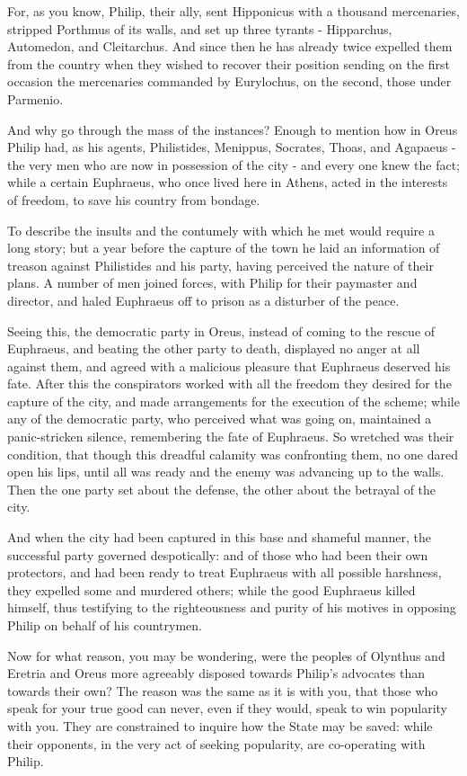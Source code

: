 \documentclass[a4paper]{amsbook}
\begin{document}
For, as you know, Philip, their ally, sent Hipponicus with a thousand mercenaries, stripped Porthmus of its walls, and set up three tyrants - Hipparchus, Automedon, and Cleitarchus. And since then he has already twice expelled them from the country when they wished to recover their position sending on the first occasion the mercenaries commanded by Eurylochus, on the second, those under Parmenio.

And why go through the mass of the instances? Enough to mention how in Oreus Philip had, as his agents, Philistides, Menippus, Socrates, Thoas, and Agapaeus - the very men who are now in possession of the city - and every one knew the fact; while a certain Euphraeus, who once lived here in Athens, acted in the interests of freedom, to save his country from bondage.

To describe the insults and the contumely with which he met would require a long story; but a year before the capture of the town he laid an information of treason against Philistides and his party, having perceived the nature of their plans. A number of men joined forces, with Philip for their paymaster and director, and haled Euphraeus off to prison as a disturber of the peace.

Seeing this, the democratic party in Oreus, instead of coming to the rescue of Euphraeus, and beating the other party to death, displayed no anger at all against them, and agreed with a malicious pleasure that Euphraeus deserved his fate. After this the conspirators worked with all the freedom they desired for the capture of the city, and made arrangements for the execution of the scheme; while any of the democratic party, who perceived what was going on, maintained a panic-stricken silence, remembering the fate of Euphraeus. So wretched was their condition, that though this dreadful calamity was confronting them, no one dared open his lips, until all was ready and the enemy was advancing up to the walls. Then the one party set about the defense, the other about the betrayal of the city.

And when the city had been captured in this base and shameful manner, the successful party governed despotically: and of those who had been their own protectors, and had been ready to treat Euphraeus with all possible harshness, they expelled some and murdered others; while the good Euphraeus killed himself, thus testifying to the righteousness and purity of his motives in opposing Philip on behalf of his countrymen.

Now for what reason, you may be wondering, were the peoples of Olynthus and Eretria and Oreus more agreeably disposed towards Philip's advocates than towards their own? The reason was the same as it is with you, that those who speak for your true good can never, even if they would, speak to win popularity with you. They are constrained to inquire how the State may be saved: while their opponents, in the very act of seeking popularity, are co-operating with Philip.
\end{document}
